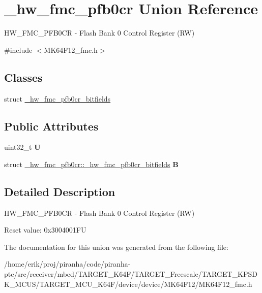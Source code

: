 \hypertarget{union__hw__fmc__pfb0cr}{}\section{\+\_\+hw\+\_\+fmc\+\_\+pfb0cr Union Reference}
\label{union__hw__fmc__pfb0cr}


H\+W\+\_\+\+F\+M\+C\+\_\+\+P\+F\+B0\+CR -\/ Flash Bank 0 Control Register (RW)  




{\ttfamily \#include $<$M\+K64\+F12\+\_\+fmc.\+h$>$}

\subsection*{Classes}
\begin{DoxyCompactItemize}
\item 
struct \hyperlink{struct__hw__fmc__pfb0cr_1_1__hw__fmc__pfb0cr__bitfields}{\+\_\+hw\+\_\+fmc\+\_\+pfb0cr\+\_\+bitfields}
\end{DoxyCompactItemize}
\subsection*{Public Attributes}
\begin{DoxyCompactItemize}
\item 
uint32\+\_\+t {\bfseries U}\hypertarget{union__hw__fmc__pfb0cr_abcfff7430b6fa2ec43d823b32e2265b6}{}\label{union__hw__fmc__pfb0cr_abcfff7430b6fa2ec43d823b32e2265b6}

\item 
struct \hyperlink{struct__hw__fmc__pfb0cr_1_1__hw__fmc__pfb0cr__bitfields}{\+\_\+hw\+\_\+fmc\+\_\+pfb0cr\+::\+\_\+hw\+\_\+fmc\+\_\+pfb0cr\+\_\+bitfields} {\bfseries B}\hypertarget{union__hw__fmc__pfb0cr_ad6161b73188807bbb10acb6081641cb7}{}\label{union__hw__fmc__pfb0cr_ad6161b73188807bbb10acb6081641cb7}

\end{DoxyCompactItemize}


\subsection{Detailed Description}
H\+W\+\_\+\+F\+M\+C\+\_\+\+P\+F\+B0\+CR -\/ Flash Bank 0 Control Register (RW) 

Reset value\+: 0x3004001\+FU 

The documentation for this union was generated from the following file\+:\begin{DoxyCompactItemize}
\item 
/home/erik/proj/piranha/code/piranha-\/ptc/src/receiver/mbed/\+T\+A\+R\+G\+E\+T\+\_\+\+K64\+F/\+T\+A\+R\+G\+E\+T\+\_\+\+Freescale/\+T\+A\+R\+G\+E\+T\+\_\+\+K\+P\+S\+D\+K\+\_\+\+M\+C\+U\+S/\+T\+A\+R\+G\+E\+T\+\_\+\+M\+C\+U\+\_\+\+K64\+F/device/device/\+M\+K64\+F12/M\+K64\+F12\+\_\+fmc.\+h\end{DoxyCompactItemize}

